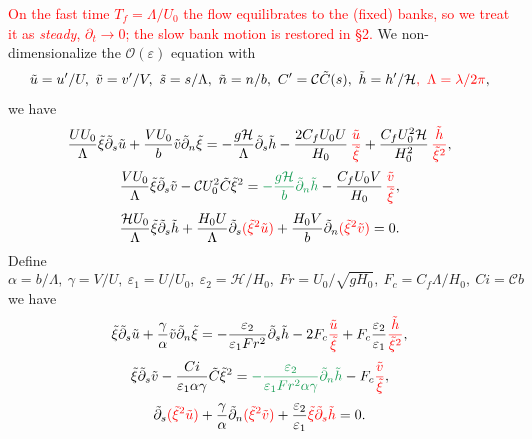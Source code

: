 \documentclass[11pt]{article}
\newcommand{\R}[1]{\textcolor{red}{#1}}
\newcommand{\G}[1]{\textcolor{ForestGreen}{#1}}
\newcommand{\dt}{\tilde{\partial}}
\begin{document}
\R{On the fast time $T_f=\Lambda/U_0$ the flow equilibrates to the (fixed) banks,
so we treat it as \emph{steady}, $\partial_t\to0$; the slow bank motion is restored
in §2.} We non-dimensionalize the
$\mathcal{O}(\varepsilon)$ equation with
\begin{equation}
\tilde u=u'/U,\ \tilde v=v'/V,\ \tilde s=s/\Lambda,\ \tilde n=n/b,\
C'=\mathcal{C}\tilde C(s),\ \tilde h=h'/\mathcal{H}\R{,\ \Lambda=\lambda/2\pi},
\end{equation}
we have
\begin{equation}
\frac{UU_0}{\Lambda}\tilde\xi\dt_s\tilde u
 + \frac{VU_0}{b}\tilde v\dt_n\tilde\xi
= -\frac{g\mathcal{H}}{\Lambda}\dt_s\tilde h
  - \frac{2C_fU_0U}{H_0}\,\R{\frac{\tilde u}{\tilde\xi}}
  + \frac{C_fU_0^2\mathcal{H}}{H_0^2}\,\R{\frac{\tilde h}{\tilde\xi^2}},
\end{equation}
\begin{equation}
\frac{VU_0}{\Lambda}\tilde\xi\dt_s\tilde v
 - \mathcal{C}U_0^2\tilde C\tilde\xi^2
= \G{-\frac{g\mathcal{H}}{b}\dt_n\tilde h}
  - \frac{C_fU_0V}{H_0}\,\R{\frac{\tilde v}{\tilde\xi}},
\end{equation}
\begin{equation}
\frac{\mathcal{H}U_0}{\Lambda}\tilde\xi\dt_s\tilde h
 + \frac{H_0U}{\Lambda}\dt_s\R{(\tilde\xi^2\tilde u)}
 + \frac{H_0V}{b}\dt_n\R{(\tilde\xi^2\tilde v)} = 0 .
\end{equation}
Define
\begin{equation}
\alpha=b/\Lambda,\ \gamma=V/U,\ \varepsilon_1=U/U_0,\
\varepsilon_2=\mathcal{H}/H_0,\ Fr=U_0/\sqrt{gH_0},\
F_c=C_f\Lambda/H_0,\ Ci=\mathcal{C}b
\end{equation}
we have
\begin{equation}
\tilde\xi\dt_s\tilde u
 + \frac{\gamma}{\alpha}\tilde v\dt_n\tilde\xi
= -\frac{\varepsilon_2}{\varepsilon_1Fr^2}\dt_s\tilde h
  - 2F_c\R{\frac{\tilde u}{\tilde\xi}}
  + F_c\frac{\varepsilon_2}{\varepsilon_1}\R{\frac{\tilde h}{\tilde\xi^2}},
\end{equation}
\begin{equation}
\tilde\xi\dt_s\tilde v
 - \frac{Ci}{\varepsilon_1\alpha\gamma}\tilde C\tilde\xi^2
= \G{-\frac{\varepsilon_2}{\varepsilon_1Fr^2\alpha\gamma}\dt_n\tilde h}
  - F_c\R{\frac{\tilde v}{\tilde\xi}},
\end{equation}
\begin{equation}
\dt_s\R{(\tilde\xi^2\tilde u)}
 + \frac{\gamma}{\alpha}\dt_n\R{(\tilde\xi^2\tilde v)}
 + \frac{\varepsilon_2}{\varepsilon_1}
   \R{\tilde\xi\dt_s\tilde h} = 0 .
\end{equation}
\end{document}
